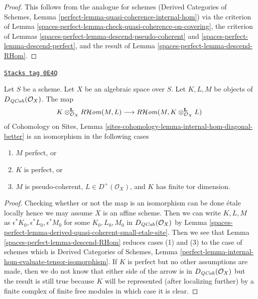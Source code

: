 \begin{proof}
This follows from the analogue for schemes
(Derived Categories of Schemes, Lemma
\ref{perfect-lemma-quasi-coherence-internal-hom})
via the criterion of Lemma \ref{spaces-perfect-lemma-check-quasi-coherence-on-covering},
the criterion of Lemmas \ref{spaces-perfect-lemma-descend-pseudo-coherent} and
\ref{spaces-perfect-lemma-descend-perfect},
and the result of Lemma \ref{spaces-perfect-lemma-descend-RHom}.
\end{proof}

\begin{lemma}
\label{spaces-perfect-lemma-internal-hom-evaluate-tensor-isomorphism}
\href{https://stacks.math.columbia.edu/tag/0E4Q}{\texttt{Stacks tag 0E4Q}}

Let $S$ be a scheme.
Let $X$ be an algebraic space over $S$.
Let $K, L, M$ be objects of $D_{\mathit{QCoh}}(\mathcal{O}_X)$.
The map
$$
K \otimes_{\mathcal{O}_X}^\mathbf{L} R\mathcal{H}\mathit{om}(M, L)
\longrightarrow
R\mathcal{H}\mathit{om}(M, K \otimes_{\mathcal{O}_X}^\mathbf{L} L)
$$
of Cohomology on Sites, Lemma
\ref{sites-cohomology-lemma-internal-hom-diagonal-better}
is an isomorphism in the following cases
\begin{enumerate}
\item $M$ perfect, or
\item $K$ is perfect, or
\item $M$ is pseudo-coherent, $L \in D^+(\mathcal{O}_X)$, and $K$ has finite
tor dimension.
\end{enumerate}
\end{lemma}

\begin{proof}
Checking whether or not the map is an isomorphism can be done
\'etale locally hence we may assume $X$ is an affine scheme.
Then we can write $K, L, M$ as $\epsilon^*K_0, \epsilon^*L_0, \epsilon^*M_0$
for some $K_0, L_0, M_0$ in $D_{\mathit{QCoh}}(\mathcal{O}_X)$ by
Lemma \ref{spaces-perfect-lemma-derived-quasi-coherent-small-etale-site}.
Then we see that Lemma \ref{spaces-perfect-lemma-descend-RHom}
reduces cases (1) and (3) to the case of schemes which
is Derived Categories of Schemes, Lemma
\ref{perfect-lemma-internal-hom-evaluate-tensor-isomorphism}.
If $K$ is perfect but no other assumptions are made, then we
do not know that either side of the arrow is in $D_{\mathit{QCoh}}(\mathcal{O}_X)$
but the result is still true because $K$ will be represented
(after localizing further) by a finite complex of finite free modules
in which case it is clear.
\end{proof}

